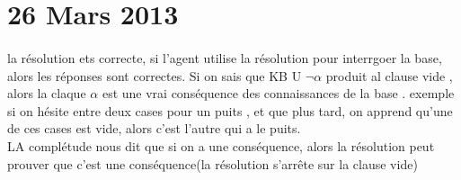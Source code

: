 \documentclass{article}
\begin{document}
\section{26 Mars 2013} 
\paragraph{} la résolution ets correcte, si l'agent utilise la résolution pour interrgoer la base, alors les réponses sont correctes. Si on sais que  KB U $\neg\alpha$ produit al clause vide , alors la claque $\alpha$ est une vrai conséquence des connaissances de la base . exemple si on hésite entre deux cases pour un puits , et que plus tard, on apprend qu'une de ces cases est vide, alors c’est l'autre qui a le puits.\\ LA complétude nous dit que si on a une conséquence, alors la résolution peut prouver que c'est une conséquence(la résolution s’arrête sur la clause vide) 
\end{document}

